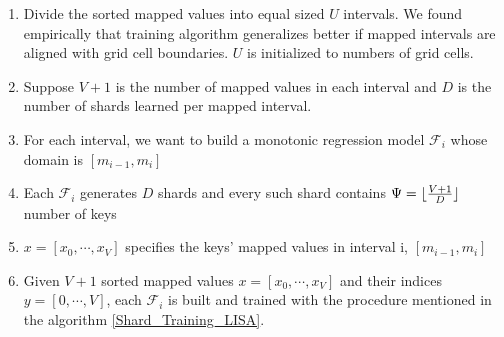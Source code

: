 \begin{enumerate}
	\item Divide the sorted mapped values into equal sized $U$ intervals. We found empirically that training algorithm generalizes better if mapped intervals are aligned with grid cell boundaries. $U$ is initialized to numbers of grid cells. 
	\item Suppose $V +1$ is the number of mapped values in each interval and $D$ is the  number of shards learned per mapped interval.
	\item For each interval, we want to build a monotonic regression
    model $ \mathcal {F}_{i}$ whose domain is $[m_{i-1},m_{i}]$ 
 
 	\item Each $\mathcal{F}_{i}$ generates $D$ shards and every such shard contains $\Psi = \lfloor\frac{V+1}{D}\rfloor$ number of keys 
    
    \item $x =[x_0,\cdots, x_V] $ specifies the keys' mapped values in interval i, $[m_{i-1},m_{i}]$ 
    
    \item Given $V +1$ sorted mapped values $x =[x_0,\cdots, x_V]$ and their indices $y =[0,\cdots, V]$, each $\mathcal{F}_{i}$ is built and trained with the procedure mentioned in the algorithm \ref{Shard_Training_LISA}.
    

\end{enumerate}


